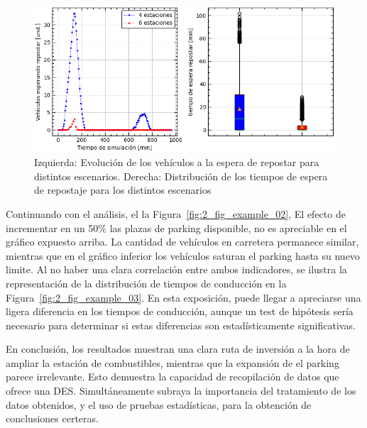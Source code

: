 \begin{figure}
	\begin{center}
		\includegraphics[width=\textwidth]{fig/2_fig_example_01}
	\end{center}
	\caption{Izquierda: Evolución de los vehículos a la espera de repostar para distintos escenarios. Derecha: Distribución de los tiempos de espera de repostaje para los distintos escenarios}
	\label{fig:2_fig_example_01}
\end{figure}

Continuando con el análisis, el la Figura~\ref{fig:2_fig_example_02},
El efecto de incrementar en un 50\% las plazas de parking disponible,
no es apreciable en el gráfico expuesto arriba.
La cantidad de vehículos en carretera permanece similar,
mientras que en el gráfico inferior los vehículos saturan el parking hasta su nuevo limite.
Al no haber una clara correlación entre ambos indicadores,
se ilustra la representación de la distribución de tiempos de conducción
en la Figura~\ref{fig:2_fig_example_03}.
En esta exposición, puede llegar a apreciarse una ligera diferencia en los tiempos de conducción,
aunque un test de hipótesis sería necesario
para determinar si estas diferencias son estadísticamente significativas.

En conclusión, los resultados muestran una clara ruta de inversión
a la hora de ampliar la estación de combustibles,
mientras que la expansión de el parking parece irrelevante.
Esto demuestra la capacidad de recopilación de datos que ofrece una DES.
Simultáneamente subraya la importancia del tratamiento de los datos obtenidos,
y el uso de pruebas estadísticas, para la obtención de conclusiones certeras.

